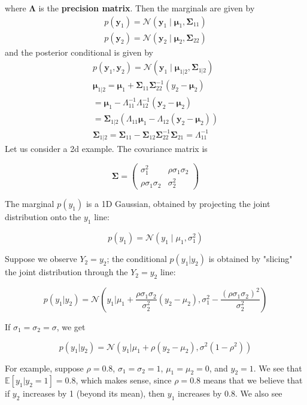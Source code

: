 \documentclass[10pt,landscape]{article}
\newcommand{\N}{\mathcal{N}}
\newcommand{\out}{\textbf{y}}
\newcommand{\Cov}{\mathbf{\Sigma}}
\newcommand{\Mean}{\boldsymbol{\mu}}
\begin{document}
\begin{multicols*}{3}
where $\bm{\Lambda}$ is the \textbf{precision matrix}. Then the marginals are given by
\begin{align*}
    p(\out_1)=\N(\out_1\mid\Mean_1,\Cov_{11}) \\ 
    p(\out_2)=\N(\out_2\mid\Mean_2,\Cov_{22})  
\end{align*}
and the posterior conditional is given by
\begin{align*}
    p(\out_1,\out_2)=\N(\out_1\mid\Mean_{1|2},\Cov_{1|2}) \\
    \Mean_{1|2}=\Mean_1+\Cov_{11}\Cov_{22}^{-1}(y_2-\Mean_2) \\
    =\Mean_1-\Lambda_{11}^{-1}\Lambda_{12}^{-1}(\out_2-\Mean_2) \\
    = \Cov_{1|2}(\Lambda_{11}\Mean_1-\Lambda_{12}(\out_2-\Mean_2))\\
    \Cov_{1|2}=\Cov_{11}-\Cov_{12}\Cov_{22}^{-1}\Cov_{21}=\Lambda_{11}^{-1}
\end{align*}
Let us consider a 2d example. The covariance matrix is

\[
\bm{\Sigma} =
\begin{pmatrix}
\sigma_1^2 & \rho \sigma_1 \sigma_2 \\
\rho \sigma_1 \sigma_2 & \sigma_2^2
\end{pmatrix}
\]

The marginal \( p(y_1) \) is a 1D Gaussian, obtained by projecting the joint distribution onto the \( y_1 \) line:

\[
p(y_1) = \mathcal{N}(y_1 \mid \mu_1, \sigma_1^2)
\]

Suppose we observe \( Y_2 = y_2 \); the conditional \( p(y_1 | y_2) \) is obtained by "slicing" the joint distribution through the \( Y_2 = y_2 \) line:

\[
p(y_1 | y_2) = \mathcal{N} \left( y_1 \Big| \mu_1 + \frac{\rho \sigma_1 \sigma_2}{\sigma_2^2} (y_2 - \mu_2), \sigma_1^2 - \frac{(\rho \sigma_1 \sigma_2)^2}{\sigma_2^2} \right)
\]

If \( \sigma_1 = \sigma_2 = \sigma \), we get

\[
p(y_1 | y_2) = \mathcal{N} \left( y_1 \Big| \mu_1 + \rho (y_2 - \mu_2), \sigma^2 (1 - \rho^2) \right)
\]

For example, suppose \( \rho = 0.8 \), \( \sigma_1 = \sigma_2 = 1 \), \( \mu_1 = \mu_2 = 0 \), and \( y_2 = 1 \). We see that \( \mathbb{E}[y_1 | y_2 = 1] = 0.8 \), which makes sense, since \( \rho = 0.8 \) means that we believe that if \( y_2 \) increases by 1 (beyond its mean), then \( y_1 \) increases by 0.8. We also see 


\end{multicols*}
\end{document}
